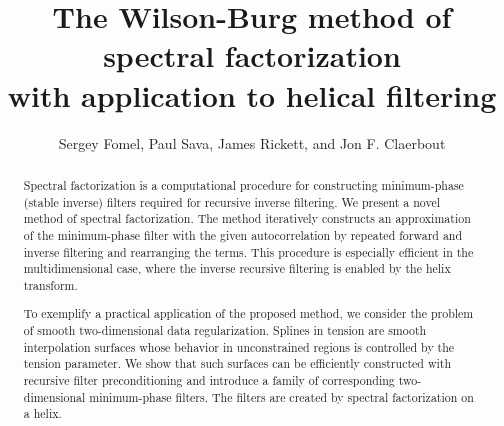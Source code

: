 
\lefthead{}
\righthead{}

\renewcommand{\thefootnote}{\fnsymbol{footnote}} 
\title{The Wilson-Burg method of spectral factorization \\
  with application to helical filtering}

\author{Sergey Fomel\/\footnotemark[1],
Paul Sava\/\footnotemark[2],
James Rickett\/\footnotemark[3],
and Jon F. Claerbout\/\footnotemark[2]} 


\maketitle

\begin{abstract}    
  Spectral factorization is a computational procedure for constructing
      minimum-phase (stable inverse) filters required for recursive
      inverse filtering. We present a novel method of spectral
      factorization. The method iteratively constructs an
      approximation of the minimum-phase filter with the given
      autocorrelation by repeated forward and inverse filtering and
      rearranging the terms. This procedure is especially efficient in
      the multidimensional case, where the inverse recursive filtering
      is enabled by the helix transform.
      
      To exemplify a practical application of the proposed method, we
      consider the problem of smooth two-dimensional data
      regularization. Splines in tension are smooth interpolation
      surfaces whose behavior in unconstrained regions is controlled
      by the tension parameter. We show that such surfaces can be
      efficiently constructed with recursive filter preconditioning
      and introduce a family of corresponding two-dimensional
      minimum-phase filters. The filters are created by spectral
      factorization on a helix.
\end{abstract}

